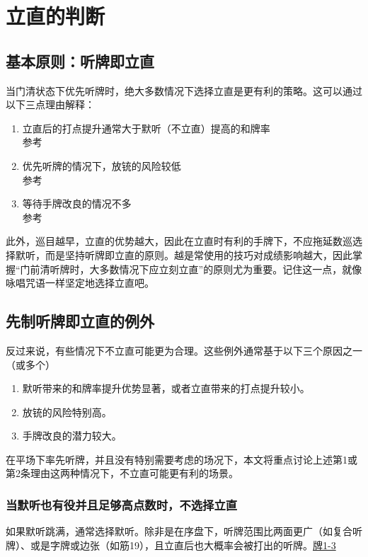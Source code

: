 \chapter{立直的判断}
\label{lecture2}

\section{基本原则：听牌即立直}
当门清状态下优先听牌时，绝大多数情况下选择立直是更有利的策略。这可以通过以下三点理由解释：
\begin{enumerate}
    \item 立直后的打点提升通常大于默听（不立直）提高的和牌率\\
          参考
    \item 优先听牌的情况下，放铳的风险较低\\
          参考
    \item 等待手牌改良的情况不多\\
          参考
\end{enumerate}
此外，巡目越早，立直的优势越大，因此在立直时有利的手牌下，不应拖延数巡选择默听，而是坚持听牌即立直的原则。越是常使用的技巧对成绩影响越大，因此掌握“门前清听牌时，大多数情况下应立刻立直”的原则尤为重要。记住这一点，就像咏唱咒语一样坚定地选择立直吧。

\section{先制听牌即立直的例外}
反过来说，有些情况下不立直可能更为合理。这些例外通常基于以下三个原因之一（或多个）
\begin{enumerate}
    \item 默听带来的和牌率提升优势显著，或者立直带来的打点提升较小。
    \item 放铳的风险特别高。
    \item 手牌改良的潜力较大。
\end{enumerate}

在平场下率先听牌，并且没有特别需要考虑的场况下，本文将重点讨论上述第1或第2条理由这两种情况下，不立直可能更有利的场景。

\subsection{当默听也有役并且足够高点数时，不选择立直}
如果默听跳满，通常选择默听。除非是在序盘下，听牌范围比两面更广（如复合听牌）、或是字牌或边张（如筋19），且立直后也大概率会被打出的听牌。\hyperref[lec2:pai1-3]{牌1-3}


